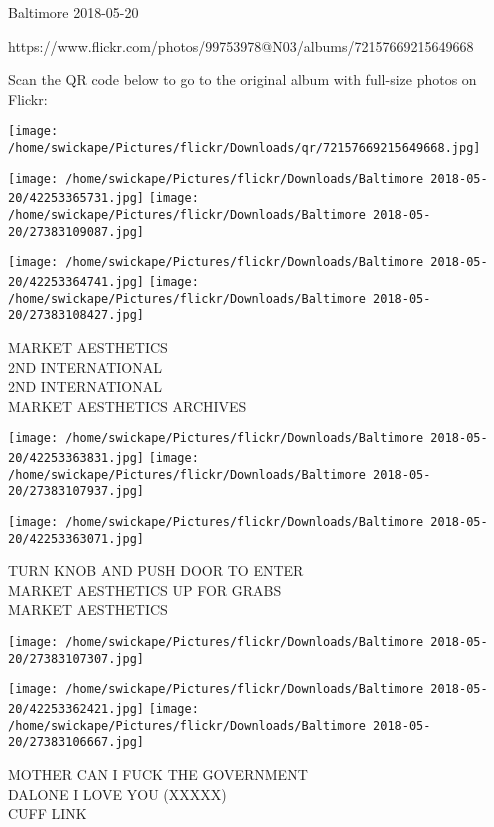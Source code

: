 \documentclass[10pt,letterpaper]{article}
\begin{document}
Baltimore 2018-05-20

https://www.flickr.com/photos/99753978@N03/albums/72157669215649668

Scan the QR code below to go to the original album with full-size photos on Flickr:

\texttt{[image: /home/swickape/Pictures/flickr/Downloads/qr/72157669215649668.jpg]}
\pagebreak

\texttt{[image: /home/swickape/Pictures/flickr/Downloads/Baltimore 2018-05-20/42253365731.jpg]}
\texttt{[image: /home/swickape/Pictures/flickr/Downloads/Baltimore 2018-05-20/27383109087.jpg]}

\texttt{[image: /home/swickape/Pictures/flickr/Downloads/Baltimore 2018-05-20/42253364741.jpg]}
\texttt{[image: /home/swickape/Pictures/flickr/Downloads/Baltimore 2018-05-20/27383108427.jpg]}

MARKET AESTHETICS\\
2ND INTERNATIONAL\\
2ND INTERNATIONAL\\
MARKET AESTHETICS ARCHIVES\\
\pagebreak

\texttt{[image: /home/swickape/Pictures/flickr/Downloads/Baltimore 2018-05-20/42253363831.jpg]}
\texttt{[image: /home/swickape/Pictures/flickr/Downloads/Baltimore 2018-05-20/27383107937.jpg]}

\texttt{[image: /home/swickape/Pictures/flickr/Downloads/Baltimore 2018-05-20/42253363071.jpg]}

TURN KNOB AND PUSH DOOR TO ENTER\\
MARKET AESTHETICS UP FOR GRABS\\
MARKET AESTHETICS\\
\pagebreak

\texttt{[image: /home/swickape/Pictures/flickr/Downloads/Baltimore 2018-05-20/27383107307.jpg]}

\vspace{0.25in}
\texttt{[image: /home/swickape/Pictures/flickr/Downloads/Baltimore 2018-05-20/42253362421.jpg]}
\texttt{[image: /home/swickape/Pictures/flickr/Downloads/Baltimore 2018-05-20/27383106667.jpg]}

MOTHER CAN I FUCK THE GOVERNMENT\\
DALONE I LOVE YOU (XXXXX)\\
CUFF LINK\\
\pagebreak
\end{document}
